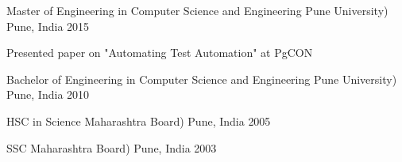 

\begin{cventries}

  \cventry
    {Master of Engineering in Computer Science and Engineering} %
    {Pune University)} %
    {Pune, India} %
    {2015} %
    {
      \begin{cvitems} %
        \item {Presented paper on "Automating Test Automation" at PgCON}
      \end{cvitems}
    }
	
	\cventry
    {Bachelor of Engineering in Computer Science and Engineering} %
    {Pune University)} %
    {Pune, India} %
    {2010} %
    {
    }
	
	\cventry
    {HSC in Science} %
    {Maharashtra Board)} %
    {Pune, India} %
    {2005} %
    {
    }
	\cventry
    {SSC} %
    {Maharashtra Board)} %
    {Pune, India} %
    {2003} %
    {
    }

\end{cventries}
